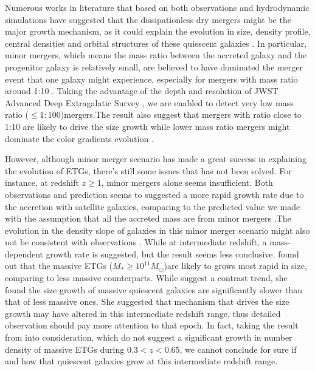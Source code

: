 \documentclass[fleqn,usenatbib]{mnras}
\begin{document}
 Numerous works in literature that based on both observations and hydrodynamic simulations have suggested that the dissipationless dry mergers might be the major growth mechanism, as it could explain the evolution in size, density profile, central densities and  orbital structures of these quiescent galaxies 
\citep{naab_minor_2009, van_dokkum_2010_hubble, oser_cosmological_2011, newman2012, hilz_how_2013, dekel_wet_2014, deugenio2023}. In particular, minor mergers, which means the mass ratio between the accreted galaxy and the progenitor galaxy is relatively small, are believed to have dominated the merger event that one galaxy might experience, especially for mergers with mass ratio around 1:10 \citep{newman2012, Belli_2015}. Taking the advantage of the depth and resolution of JWST Advanced Deep Extragalatic Survey \citep{Gardner_JWST,Eisenstein_JADES}, we are enabled to detect very low mass ratio ($ \leq 1:100$)mergers.The result also suggest that mergers with ratio close to 1:10 are likely to drive the size growth while lower mass ratio mergers might dominate the color gradients evolution \citep{Suess2023}. 
\par However, although minor merger scenario has made a great success in explaining the evolution of ETGs, there's still some issues that has not been solved. For instance, at redshift $z \geq 1$, minor mergers alone seems insufficient. Both observations and prediction seems to suggested a more rapid growth rate due to the accretion with satellite galaxies, comparing to the predicted value we made with the assumption that all the accreted mass are from minor mergers \citep{hopkins_discriminating_2010,nipoti2009}.The evolution in the density slope of galaxies in this minor merger scenario might also not be consistent with observations \citep{sonnenfeld2014}. While at intermediate redshift, a mass-dependent growth rate is suggested, but the result seems less conclusive. \cite{vanderwel3DHSTCANDELSEvolution2014,KiDs_Roy} found out that the massive ETGs ($M_* \geq 10^{11} M_\odot$)are likely to grows most rapid in size, comparing to less massive counterparts. While \cite{damjanov2019} suggest a contrast trend, she found the size growth of massive quiescent galaxies are significantly slower than that of less massive ones. She suggested that mechanism that drives the size growth may have altered in this intermediate redshift range, thus detailed observation should pay more attention to that epoch. In fact, taking the result from \cite{Bundy2017} into consideration, which do not suggest a significant growth in number density of massive ETGs during $0.3 < z < 0.65$, we cannot conclude for sure if and how that quiescent galaxies grow at this intermediate redshift range.
\end{document}

